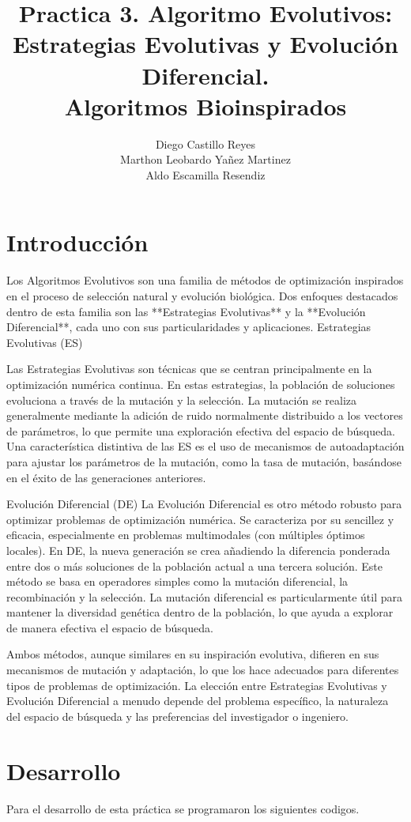 \documentclass{report}
\title{\Huge{\textbf{Practica 3. Algoritmo Evolutivos: Estrategias Evolutivas y Evolución Diferencial.}}\\
\Large{\textbf{Algoritmos Bioinspirados}}}
\author{Diego Castillo Reyes\\Marthon Leobardo Yañez Martinez\\Aldo Escamilla Resendiz}
\begin{document}
    \maketitle
    \tableofcontents
    \newpage
    \section{Introducción}
    Los Algoritmos Evolutivos son una familia de métodos de optimización inspirados en el proceso de selección natural y evolución biológica. Dos enfoques destacados dentro de esta familia son las **Estrategias Evolutivas** y la **Evolución Diferencial**, cada uno con sus particularidades y aplicaciones.
Estrategias Evolutivas (ES)

Las Estrategias Evolutivas son técnicas que se centran principalmente en la optimización numérica continua. En estas estrategias, la población de soluciones evoluciona a través de la mutación y la selección. La mutación se realiza generalmente mediante la adición de ruido normalmente distribuido a los vectores de parámetros, lo que permite una exploración efectiva del espacio de búsqueda. Una característica distintiva de las ES es el uso de mecanismos de autoadaptación para ajustar los parámetros de la mutación, como la tasa de mutación, basándose en el éxito de las generaciones anteriores.

Evolución Diferencial (DE)
La Evolución Diferencial es otro método robusto para optimizar problemas de optimización numérica. Se caracteriza por su sencillez y eficacia, especialmente en problemas multimodales (con múltiples óptimos locales). En DE, la nueva generación se crea añadiendo la diferencia ponderada entre dos o más soluciones de la población actual a una tercera solución. Este método se basa en operadores simples como la mutación diferencial, la recombinación y la selección. La mutación diferencial es particularmente útil para mantener la diversidad genética dentro de la población, lo que ayuda a explorar de manera efectiva el espacio de búsqueda.

Ambos métodos, aunque similares en su inspiración evolutiva, difieren en sus mecanismos de mutación y adaptación, lo que los hace adecuados para diferentes tipos de problemas de optimización. La elección entre Estrategias Evolutivas y Evolución Diferencial a menudo depende del problema específico, la naturaleza del espacio de búsqueda y las preferencias del investigador o ingeniero.

\section{Desarrollo}
Para el desarrollo de esta práctica se programaron los siguientes codigos.
\end{document}
